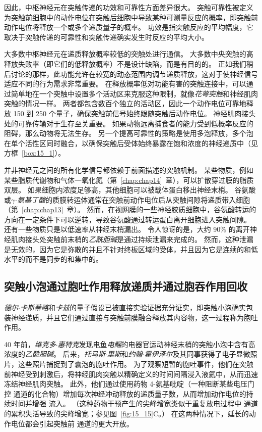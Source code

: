 因此，中枢神经元在突触传递的功效和可靠性方面差异很大。
突触可靠性被定义为突触前细胞中的动作电位在突触后细胞中导致某种可测量反应的概率，即突触前动作电位将释放一个或多个递质量子的概率。
功效是指突触反应的平均幅度，它取决于突触传递的可靠性和突触传递确实发生时反应的平均大小。


大多数中枢神经元在递质释放概率较低的突触处进行通信。
大多数中央突触的高释放失败率（即它们的低释放概率）不是设计缺陷，而是有目的的。
正如我们稍后讨论的那样，此功能允许在较宽的动态范围内调节递质释放，这对于使神经信号适应不同的行为需求非常重要。
在释放概率低对功能有害的突触连接中，可以通过简单地在一个突触中设置多个活动区来克服这种限制，就像\textit{花萼突触}和神经肌肉突触的情况一样。
两者都包含数百个独立的活动区，因此一个动作电位可靠地释放 150 到 250 个量子，确保突触前信号始终跟随突触后动作电位。
神经肌肉接头处的可靠传输对于生存至关重要。
如果动物远离捕食者的能力受到低概率反应的阻碍，那么动物将无法生存。
另一个提高可靠性的策略是使用多泡释放，多个泡在单个活性区同时融合，以确保突触后受体始终暴露在饱和浓度的神经递质中（见方框~\ref{box:15_1}）。


并非神经元之间的所有化学信号都依赖于前面描述的突触机制。
某些物质，例如某些脂质代谢物和气体一氧化氮（第~\ref{chap:chap14}~章），可以扩散穿过膜的脂质双层。
如果细胞内浓度足够高，其他细胞可以被载体蛋白移出神经末梢。
谷氨酸或\textit{$\gamma$-氨基丁酸}的质膜转运体通常在突触前动作电位后从突触间隙将递质带入细胞（第~\ref{chap:chap13}~章）。
然而，在视网膜的一些神经胶质细胞中，谷氨酸转运的方向在一定条件下可以逆转，导致谷氨酸通过转运蛋白离开细胞进入突触间隙。
还有一些物质只是以低速率从神经末梢漏出。
令人惊讶的是，大约 90\% 的离开神经肌肉接头处突触前末梢的\textit{乙酰胆碱}是通过持续泄漏来完成的。
然而，这种泄漏是无效的，因为它是弥散的并且不针对终板区域的受体，并且因为它是连续的和低水平的而不是同步的和集中的。



\subsection{突触小泡通过胞吐作用释放递质并通过胞吞作用回收}

\textit{德尔$\cdot$卡斯蒂略}和\textit{卡兹}的量子假设已被直接实验证据充分证实，即突触小泡确实包装神经递质，并且它们通过直接与突触前膜融合释放其内容物，这一过程称为胞吐作用。


40 年前，\textit{维克多$\cdot$惠特克}发现电鱼\textit{电鳐}的电器官运动神经末梢的突触小泡中含有高浓度的\textit{乙酰胆碱}。
后来，\textit{托马斯$\cdot$里斯}和\textit{约翰$\cdot$霍伊泽尔}及其同事获得了电子显微照片，这些照片捕捉到了囊泡的胞吐作用。
为了观察短暂的胞吐事件，他们在突触前神经受到刺激后，将神经肌肉突触以精确定义的时间间隔浸入液氦中，从而迅速冻结神经肌肉突触。
此外，他们通过使用药物 4-氨基吡啶（一种阻断某些电压门控  通道的化合物）增加每次神经冲动释放的递质量子数，从而增加动作电位的持续时间并增强  流入。
（这种药物干预产生的尖峰增宽类似于重复放电过程中  通道的累积失活导致的尖峰增宽；参见图~\ref{fig:15_15}C。）
在这两种情况下，延长的动作电位都会引起突触前  通道的更大开放。


